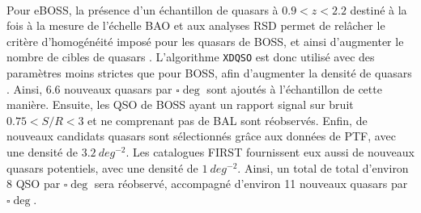 

\paragraph{}
Pour eBOSS, la présence d'un échantillon de quasars à $\num{0,9} < z < \num{2,2}$ destiné à la fois à la mesure de l'échelle BAO et aux analyses RSD permet de relâcher le critère d'homogénéité imposé pour les quasars de BOSS, et ainsi d'augmenter le nombre de cibles de quasars \lya{}.
L'algorithme \texttt{XDQSO} est donc utilisé avec des paramètres moins strictes que pour BOSS, afin d'augmenter la densité de quasars \lya{}.
Ainsi, \num{6,6} nouveaux quasars par $\si{\square\deg}$ sont ajoutés à l'échantillon de cette manière.
Ensuite, les QSO de BOSS ayant un rapport signal sur bruit $\num{0,75} < S/R < \num{3}$ et ne comprenant pas de BAL sont réobservés.
Enfin, de nouveaux candidats quasars sont sélectionnés gr\^ace aux données de PTF, avec une densité de $\SI{3,2}{deg^{-2}}$. Les catalogues FIRST fournissent eux aussi de nouveaux quasars potentiels, avec une densité de $\SI{1}{deg^{-2}}$.
Ainsi, un total de total d'environ 8 QSO par $\si{\square\deg}$ sera réobservé, accompagné d'environ 11 nouveaux quasars par $\si{\square\deg}$.



